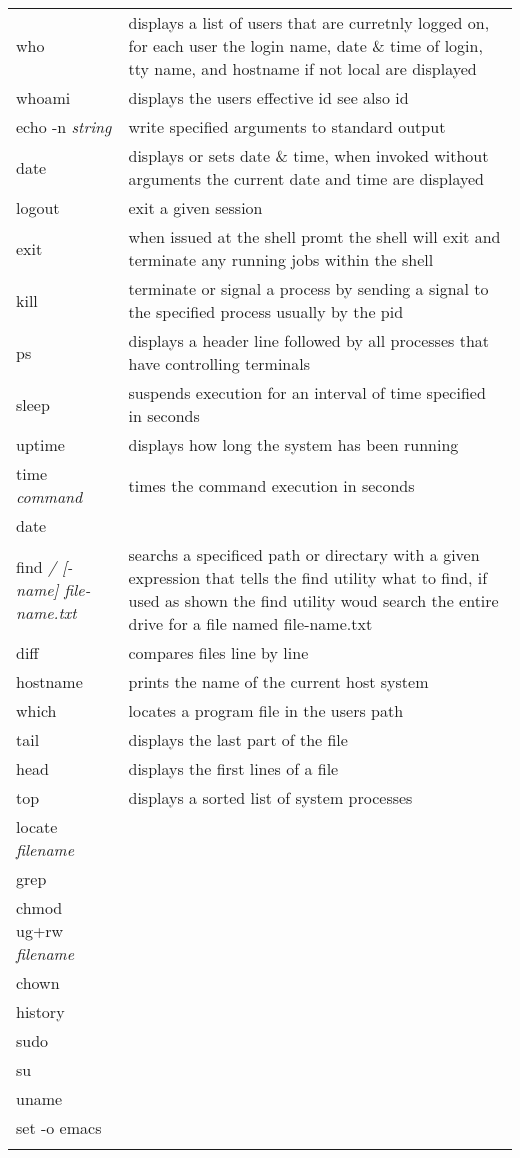 \begin{center}
\begin{longtable}{|p{4cm}|p{8cm}|}
  who & displays a list of users that are curretnly logged on, for
  each user the login name, date \& time of login, tty name, and
  hostname if not local are displayed\\
  whoami & displays the users effective id see also id \\
  echo -n \textit{string} & write specified arguments to standard output \\
  date & displays or sets date \& time, when invoked without arguments
  the current date and time are displayed\\
  logout & exit a given session\\
  exit & when issued at the shell promt the shell will exit and
  terminate any running jobs within the shell\\
  kill & terminate or signal a process by sending a signal to the
  specified process usually by the pid  \\
  ps & displays a header line followed by all processes that have
  controlling terminals\\
  sleep & suspends execution for an interval of time specified in seconds \\
  uptime & displays how long the system has been running \\
  time  \emph{command} & times the command execution in seconds\\
  date & \\
  find \textit{ / [-name] file-name.txt} &
  searchs a specificed path or directary with a given expression that
  tells the find utility what to find, if used as shown the find
  utility woud search the entire drive for a file named file-name.txt\\
  diff & compares files line by line \\
  hostname & prints the name of the current host system \\
  which & locates a program file in the users path \\
  tail & displays the last part of the file \\
  head & displays the first lines of a file \\
  top & displays a sorted list of system processes \\
  locate \textit{filename} & \\
  grep & \\
  chmod ug+rw \textit{filename} & \\
  chown & \\
  history & \\
  sudo & \\
  su & \\
  uname & \\
  set -o emacs & \\
  & \\
  

\end{longtable}
\end{center}
